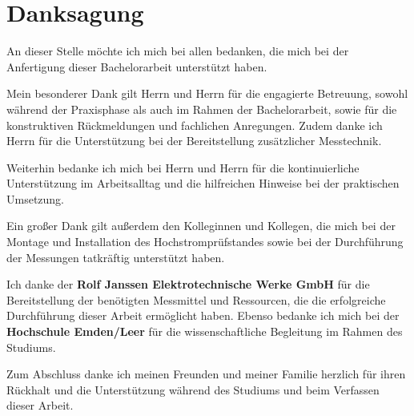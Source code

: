 
\section*{Danksagung}

An dieser Stelle möchte ich mich bei allen bedanken, die mich bei der Anfertigung dieser Bachelorarbeit unterstützt haben.

Mein besonderer Dank gilt Herrn \textbf{\betreuerEins{}} und Herrn \textbf{\betreuerZwei{}} für die engagierte Betreuung, sowohl während der Praxisphase als auch im Rahmen der Bachelorarbeit, sowie für die konstruktiven Rückmeldungen und fachlichen Anregungen. Zudem danke ich Herrn \betreuerEins{} für die Unterstützung bei der Bereitstellung zusätzlicher Messtechnik.

Weiterhin bedanke ich mich bei Herrn \betreuerDrei{} und Herrn \betreuerVier{} für die kontinuierliche Unterstützung im Arbeitsalltag und die hilfreichen Hinweise bei der praktischen Umsetzung.

Ein großer Dank gilt außerdem den Kolleginnen und Kollegen, die mich bei der Montage und Installation des Hochstromprüfstandes sowie bei der Durchführung der Messungen tatkräftig unterstützt haben.

Ich danke der \textbf{Rolf Janssen Elektrotechnische Werke GmbH} für die Bereitstellung der benötigten Messmittel und Ressourcen, die die erfolgreiche Durchführung dieser Arbeit ermöglicht haben. Ebenso bedanke ich mich bei der \textbf{Hochschule Emden/Leer} für die wissenschaftliche Begleitung im Rahmen des Studiums.

Zum Abschluss danke ich meinen Freunden und meiner Familie herzlich für ihren Rückhalt und die Unterstützung während des Studiums und beim Verfassen dieser Arbeit.
